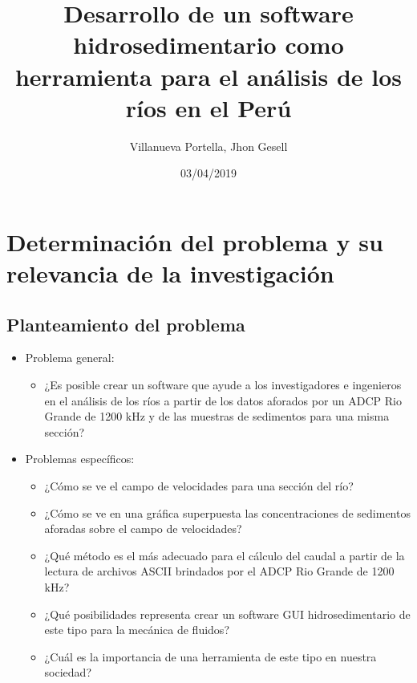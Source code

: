 \documentclass[12pt,a4paper]{report}
\begin{document}
\title{Desarrollo de un software hidrosedimentario como herramienta para el análisis de los ríos en el Perú}
\author{Villanueva Portella, Jhon Gesell}
\date{03/04/2019}
\maketitle
\section{Determinación del problema y su relevancia de la investigación}

\subsection{Planteamiento del problema}
\begin{itemize}

\item Problema general:
	\begin{itemize}
	\item ¿Es posible crear un software que ayude a los investigadores e ingenieros en el análisis de los ríos a partir de los datos aforados por un ADCP Rio Grande de 1200 kHz y de las muestras de sedimentos para una misma sección?
	\end{itemize}
\item Problemas específicos:
	\begin{itemize}
	\item ¿Cómo se ve el campo de velocidades para una sección del río?
	\item ¿Cómo se ve en una gráfica superpuesta las concentraciones de sedimentos aforadas sobre el campo de velocidades?
	\item ¿Qué método es el más adecuado para el cálculo del caudal a partir de la lectura de archivos ASCII brindados por el ADCP Rio Grande de 1200 kHz?
	\item ¿Qué posibilidades representa crear un software GUI hidrosedimentario de este tipo para la mecánica de fluidos?
	\item ¿Cuál es la importancia de una herramienta de este tipo en nuestra sociedad?
	\end{itemize}
\end{itemize}
\end{document}
